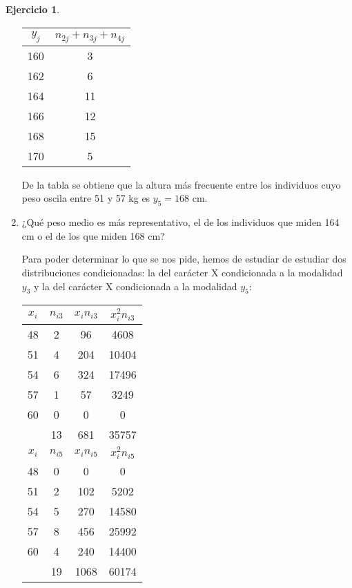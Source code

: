 \documentclass[a4paper, 12pt]{article}
\theoremstyle{definition}
\newtheorem{ej}{Ejercicio}
\begin{document}
\begin{ej}
\begin{enumerate}[label=\alph*)]
\begin{center}
\begin{tabular}{c|c}
	\(y_j\) & \(n_{2j}+n_{3j}+n_{4j}\)\\
	\hline
	160 & 3 \\
	162 & 6\\
	164 & 11\\
	166 & 12\\
	168 & 15\\
	170 & 5\\
\end{tabular}
\end{center}

De la tabla se obtiene que la altura más frecuente entre los individuos cuyo peso oscila entre 51 y 57 kg es $y_5 = 168$ cm.

\item ¿Qué peso medio es más representativo, el de los individuos que miden 164 cm o el de los
que miden 168 cm?

Para poder determinar lo que se nos pide, hemos de estudiar de estudiar dos distribuciones condicionadas: la del carácter X condicionada a la modalidad $y_3$ y la del carácter X condicionada a la modalidad $y_5$:

\begin{center}
\begin{tabular}{c|c|c|c}
	\(x_i\) & \(n_{i3}\) & \(x_i n_{i3}\) & \(x_{i}^{2} n_{i3}\)\\
	\hline
	48 & 2 & 96 & 4608\\
	51 & 4 & 204 & 10404\\
	54 & 6 & 324 & 17496\\
	57 & 1 & 57 & 3249\\
	60 & 0 & 0 & 0\\
	& 13 & 681 & 35757\\
	
	\(x_i\) & \(n_{i5}\) & \(x_i n_{i5}\) & \(x_{i}^{2} n_{i5}\)\\
	\hline
	48 & 0 & 0 & 0\\
	51 & 2 & 102 & 5202\\
	54 & 5 & 270 & 14580\\
	57 & 8 & 456 & 25992\\
	60 & 4 & 240 & 14400\\
	& 19 & 1068 & 60174\\
\end{tabular}
\end{center}

\newpage


\end{enumerate}
\end{ej}
\end{document}
